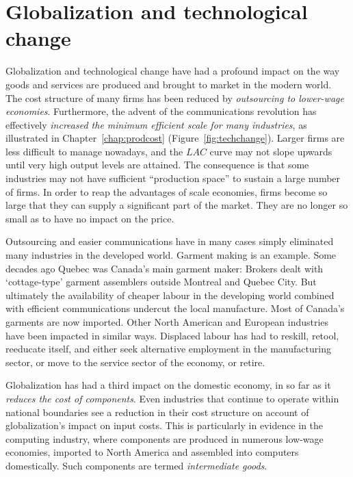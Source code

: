 \section{Globalization and technological change}\label{sec:ch9sec6}

Globalization and technological change have had a profound impact on the way
goods and services are produced and brought to market in the modern world.
The cost structure of many firms has been reduced by \textit{outsourcing to
lower-wage economies}. Furthermore, the advent of the communications
revolution has effectively \textit{increased the minimum efficient scale for
many industries}, as illustrated in Chapter~\ref{chap:prodcost} 
(Figure~\ref{fig:techchange}). Larger firms are less difficult to manage nowadays,
and the $LAC$ curve may not slope upwards until very high output levels are
attained. The consequence is that some industries may not have sufficient
``production space'' to sustain a large number of firms. In order to reap
the advantages of scale economies, firms become so large that they can
supply a significant part of the market. They are no longer so small as to
have no impact on the price.

Outsourcing and easier communications have in many cases simply eliminated
many industries in the developed world. Garment making is an example. Some
decades ago Quebec was Canada's main garment maker: Brokers dealt with
`cottage-type' garment assemblers outside Montreal and Quebec City. But
ultimately the availability of cheaper labour in the developing world
combined with efficient communications undercut the local manufacture. Most
of Canada's garments are now imported. Other North American and European
industries have been impacted in similar ways. Displaced labour has had to
reskill, retool, reeducate itself, and either seek alternative employment in
the manufacturing sector, or move to the service sector of the economy, or
retire.

Globalization has had a third impact on the domestic economy, in so far as
it \textit{reduces the cost of components}. Even industries that continue to
operate within national boundaries see a reduction in their cost structure
on account of globalization's impact on input costs. This is particularly in
evidence in the computing industry, where components are produced in
numerous low-wage economies, imported to North America and assembled into
computers domestically. Such components are termed \textit{intermediate goods}.